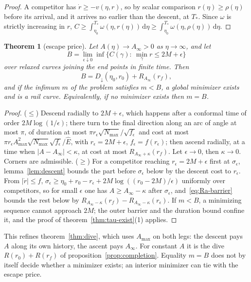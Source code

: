 \documentclass[aip,jmp,amsmath,amssymb,reprint]{revtex4-2}
\newcommand{\Ehat}{\hat E}
\newcommand{\dd}{\mathrm{d}}
\theoremstyle{plain}
\newtheorem{theorem}{Theorem}
\theoremstyle{definition}
\begin{document}
\begin{proof}
A competitor has $\dot r\ge-v(\eta,r)$, so by scalar comparison $r(\eta)\ge\rho(\eta)$ before its
arrival, and it arrives no earlier than the descent, at $T_*$. Since $\omega$ is strictly
increasing in $r$,
$C\ge\int_{\eta_0}^{T_*}\omega(\eta,r(\eta))\,\dd\eta\ge\int_{\eta_0}^{T_*}\omega(\eta,\rho(\eta))\,\dd\eta$.
\end{proof}

\begin{theorem}[escape price]\label{thm:escape}
Let $A(\eta)\to A_\infty>0$ as $\eta\to\infty$, and let
\[
  B=\lim_{\epsilon\downarrow0}\inf\{C(\gamma):\ \min_\gamma r\le2M+\epsilon\}
\]
over relaxed curves joining the end points in finite time. Then
\[
  B=D_\downarrow(\eta_0,r_0)+R_{A_\infty}(r_f),
\]
and if the infimum $m$ of the problem satisfies $m<B$, a global minimizer exists and is a
rail curve. Equivalently, if no minimizer exists then $m=B$.
\end{theorem}

\begin{proof}
($\le$) Descend radially to $2M+\epsilon$, which happens after a conformal time of order
$2M\log(1/\epsilon)$; there turn to the final direction along an arc of angle at most $\pi$, of
duration at most $\pi r_\epsilon\sqrt{N_{\max}}/\sqrt{f_\epsilon}$ and cost at most
$\pi r_\epsilon A_{\max}^2\sqrt{N_{\max}}\sqrt{f_\epsilon}/\Ehat$, with $r_\epsilon=2M+\epsilon$, $f_\epsilon=f(r_\epsilon)$; then ascend radially, at a time when $|A-A_\infty|<\kappa$,
at cost at most $R_{A_\infty+\kappa}(r_f)$. Let $\epsilon\to0$, then $\kappa\to0$. Corners are
admissible. ($\ge$) For a competitor reaching $r_\epsilon=2M+\epsilon$ first at $\sigma_\epsilon$,
lemma~\ref{lem:descent} bounds the part before $\sigma_\epsilon$ below by the descent cost to
$r_\epsilon$. From $|\dot r|\le f$,
$\sigma_\epsilon\ge\eta_0+r_0-r_\epsilon+2M\log((r_0-2M)/\epsilon)$ uniformly over competitors, so for
small $\epsilon$ one has $A\ge A_\infty-\kappa$ after $\sigma_\epsilon$, and~\eqref{eq:Ra-barrier}
bounds the rest below by $R_{A_\infty-\kappa}(r_f)-R_{A_\infty-\kappa}(r_\epsilon)$. If $m<B$, a
minimizing sequence cannot approach $2M$; the outer barrier and the duration bound confine
it, and the proof of theorem~\ref{thm:tau-exist}(1) applies.
\end{proof}

This refines theorem~\ref{thm:dive}, which uses $A_{\max}$ on both legs: the descent pays $A$
along its own history, the ascent pays $A_\infty$. For constant $A$ it is the dive
$R(r_0)+R(r_f)$ of proposition~\ref{prop:completion}. Equality $m=B$ does not by itself
decide whether a minimizer exists; an interior minimizer can tie with the escape price.
\end{document}
